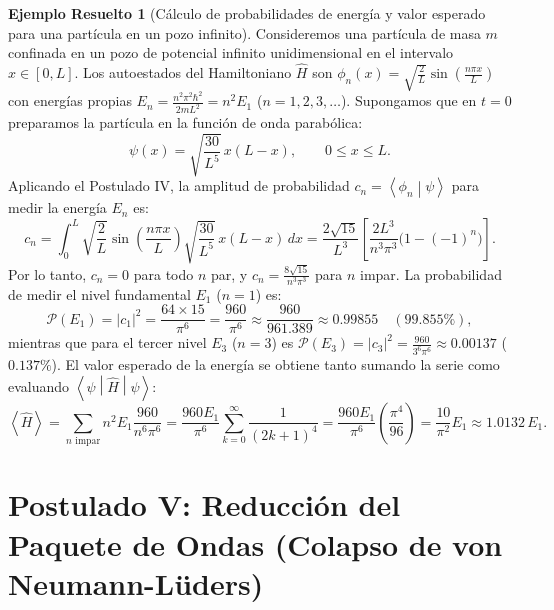 \documentclass[11pt,a4paper,twoside]{report}
\theoremstyle{definition}
\newtheorem{ejemplo}{Ejemplo Resuelto}[chapter]
\theoremstyle{plain}
\theoremstyle{remark}
\newcommand{\braket}[2]{\left\langle #1 \middle| #2 \right\rangle}
\newcommand{\mel}[3]{\left\langle #1 \middle| #2 \middle| #3 \right\rangle}
\newcommand{\expval}[1]{\left\langle #1 \right\rangle}
\newcommand{\op}[1]{\hat{#1}}
\begin{document}
\begin{ejemplo}[Cálculo de probabilidades de energía y valor esperado para una partícula en un pozo infinito]
Consideremos una partícula de masa $m$ confinada en un pozo de potencial infinito unidimensional en el intervalo $x \in [0, L]$. Los autoestados del Hamiltoniano $\op{H}$ son $\phi_n(x) = \sqrt{\frac{2}{L}}\sin\left(\frac{n\pi x}{L}\right)$ con energías propias $E_n = \frac{n^2 \pi^2 \hbar^2}{2mL^2} = n^2 E_1$ ($n = 1, 2, 3, \dots$). Supongamos que en $t = 0$ preparamos la partícula en la función de onda parabólica:
\begin{equation}
    \psi(x) = \sqrt{\frac{30}{L^5}}\, x(L - x), \qquad 0 \le x \le L.
\end{equation}
Aplicando el Postulado IV, la amplitud de probabilidad $c_n = \braket{\phi_n}{\psi}$ para medir la energía $E_n$ es:
\begin{equation}
    c_n = \int_0^L \sqrt{\frac{2}{L}}\sin\left(\frac{n\pi x}{L}\right) \sqrt{\frac{30}{L^5}}\,x(L - x)\,dx = \frac{2\sqrt{15}}{L^3} \left[ \frac{2L^3}{n^3\pi^3}\big(1 - (-1)^n\big) \right].
\end{equation}
Por lo tanto, $c_n = 0$ para todo $n$ par, y $c_n = \frac{8\sqrt{15}}{n^3 \pi^3}$ para $n$ impar. La probabilidad de medir el nivel fundamental $E_1$ ($n=1$) es:
\begin{equation}
    \mathcal{P}(E_1) = |c_1|^2 = \frac{64 \times 15}{\pi^6} = \frac{960}{\pi^6} \approx \frac{960}{961.389} \approx 0.99855 \quad (99.855\%),
\end{equation}
mientras que para el tercer nivel $E_3$ ($n=3$) es $\mathcal{P}(E_3) = |c_3|^2 = \frac{960}{3^6 \pi^6} \approx 0.00137$ ($0.137\%$). El valor esperado de la energía se obtiene tanto sumando la serie como evaluando $\mel{\psi}{\op{H}}{\psi}$:
\begin{equation}
    \expval{\op{H}} = \sum_{n \text{ impar}} n^2 E_1 \frac{960}{n^6 \pi^6} = \frac{960 E_1}{\pi^6} \sum_{k=0}^{\infty} \frac{1}{(2k+1)^4} = \frac{960 E_1}{\pi^6} \left(\frac{\pi^4}{96}\right) = \frac{10}{\pi^2} E_1 \approx 1.0132\, E_1.
\end{equation}
\end{ejemplo}

\section{Postulado V: Reducción del Paquete de Ondas (Colapso de von Neumann-Lüders)}
\end{document}

